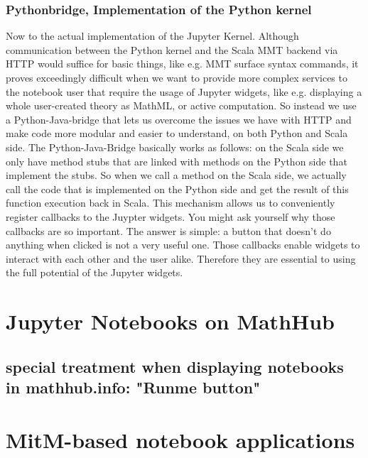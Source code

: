 \documentclass[book]{deliverablereport}
\begin{document}
\subsubsection{Pythonbridge, Implementation of the Python kernel}
Now to the actual implementation of the Jupyter Kernel. Although communication between 
the Python kernel and the Scala MMT backend via HTTP would suffice for basic things,
like e.g. MMT surface syntax commands, it proves exceedingly difficult when we want to 
provide more complex services to the notebook user that require the usage of Jupyter widgets,
like e.g. displaying a whole user-created theory as MathML, or active computation. 
So instead we use a Python-Java-bridge that lets us overcome the issues we have with HTTP and
make code more modular and easier to understand, on both Python and Scala side.
The Python-Java-Bridge basically works as follows: on the Scala side we only have method stubs
that are linked with methods on the Python side that implement the stubs. So when we call 
a method on the Scala side, we actually call the code that is implemented on the Python side 
and get the result of this function execution back in Scala. This mechanism allows us to 
conveniently register callbacks to the Juypter widgets. You might ask yourself why those callbacks 
are so important. The answer is simple: a button that doesn't do anything when clicked is not 
a very useful one. Those callbacks enable widgets to interact with each other and the user alike. 
Therefore they are essential to using the full potential of the Jupyter widgets.


\section{Jupyter Notebooks on MathHub}
\subsection{special treatment when displaying notebooks in mathhub.info: "Runme button"}

\section{MitM-based notebook applications}
\end{document}
